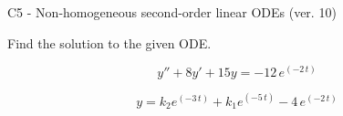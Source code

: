 \begin{exercise}
  \begin{exerciseTitle}C5 - Non-homogeneous second-order linear ODEs (ver. 10)\end{exerciseTitle}
  \begin{exerciseStatement}
    
Find the solution to the given ODE.

    
\[y''+8y'+15y = -12 \, e^{\left(-2 \, t\right)}\]

  \end{exerciseStatement}
  \begin{exerciseAnswer}
    
\[y= k_{2} e^{\left(-3 \, t\right)} + k_{1} e^{\left(-5 \, t\right)} - 4 \, e^{\left(-2 \, t\right)}\]

  \end{exerciseAnswer}
\end{exercise}